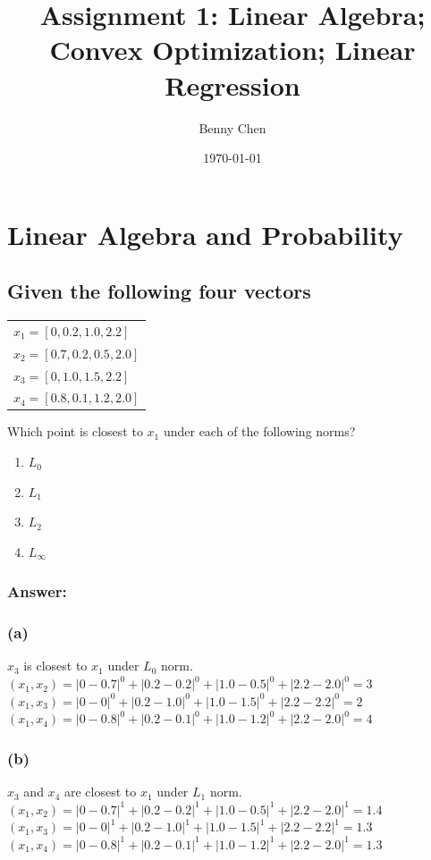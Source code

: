 \documentclass{article}
\title{Assignment 1: Linear Algebra; Convex Optimization; Linear Regression}
\author{Benny Chen}
\date{\today}
\begin{document}
\maketitle

\section{Linear Algebra and Probability}

\subsection{Given the following four vectors}

\begin{table}[h!]
    \begin{tabular}{l}
    $x_1 = [0,0.2,1.0,2.2]$   \\
    $x_2 = [0.7,0.2,0.5,2.0]$ \\
    $x_3 = [0,1.0,1.5,2.2]$   \\
    $x_4 = [0.8,0.1,1.2,2.0]$
    \end{tabular}
\end{table}

Which point is closest to $x_1$ under each of the following norms?

\begin{enumerate}[label= (\alph*)]
    \item $L_0$
    \item $L_1$
    \item $L_2$
    \item $L_\infty$
\end{enumerate}

\subsubsection*{Answer:}

\subsubsection*{(a)}
$x_3$ is closest to $x_1$ under $L_0$ norm. 
\\
$(x_1,x_2) = |0 - 0.7|^0 + |0.2 - 0.2|^0 + |1.0 - 0.5|^0 + |2.2 - 2.0|^0 = 3$
\\
$(x_1,x_3) = |0 - 0|^0 + |0.2 - 1.0|^0 + |1.0 - 1.5|^0 + |2.2 - 2.2|^0 = 2$
\\
$(x_1,x_4) = |0 - 0.8|^0 + |0.2 - 0.1|^0 + |1.0 - 1.2|^0 + |2.2 - 2.0|^0 = 4$

\subsubsection*{(b)}
$x_3$ and $x_4$ are closest to $x_1$ under $L_1$ norm.
\\
$(x_1,x_2) = |0 - 0.7|^1 + |0.2 - 0.2|^1 + |1.0 - 0.5|^1 + |2.2 - 2.0|^1 = 1.4$
\\
$(x_1,x_3) = |0 - 0|^1 + |0.2 - 1.0|^1 + |1.0 - 1.5|^1 + |2.2 - 2.2|^1 = 1.3$
\\
$(x_1,x_4) = |0 - 0.8|^1 + |0.2 - 0.1|^1 + |1.0 - 1.2|^1 + |2.2 - 2.0|^1 = 1.3$
\end{document}
